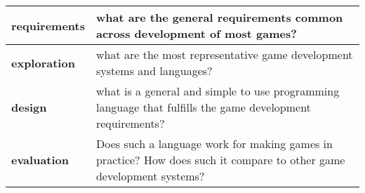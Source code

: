 \begin{tabular}{ | l | p{6cm} | }
\hline
\textbf{requirements} & what are the general requirements common across development of most games? \\
\hline
\textbf{exploration} & what are the most representative game development systems and languages? \\
\hline
\textbf{design} & what is a general and simple to use programming language that fulfills the game development requirements? \\
\hline
\textbf{evaluation} & Does such a language work for making games in practice? How does such it compare to other game development systems? \\
\hline
\end{tabular}
